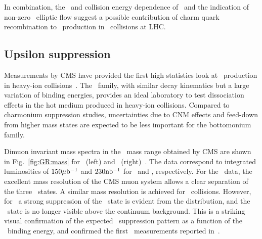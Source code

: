 In combination, the \pT\ and collision energy dependence of \jpsi \Raa\ and the indication of non-zero \jpsi\ elliptic
flow suggest a possible  contribution of charm quark recombination to \jpsi\ production in \PbPb\ collisions
at LHC.

\subsection{Upsilon suppression}

Measurements by CMS have provided the first high statistics look at \PgU\
production in heavy-ion collisions~\cite{CMS_Y_2010}.
The \PgU\ family, with similar decay kinematics but a large variation of binding energies,
provides an ideal laboratory to test dissociation effects in the hot medium produced in
heavy-ion collisions. Compared to charmonium suppression studies, uncertainties due
to CNM effects and feed-down from higher mass states are expected to be
less important for the bottomonium family.

Dimuon invariant mass spectra in the \PgU\ mass range obtained by CMS are shown in Fig.~\ref{fig:GR:mass} for \PbPb\ (left)
and \pp\ (right)~\cite{Chatrchyan:2012lxa}. The data correspond to integrated luminosities of $150\mathrm{\mu b^{-1}}$ and $230 \mathrm{nb^{-1}}$ for
\PbPb\ and \pp, respectively. For the \pp\ data, the excellent mass resolution of the CMS muon system
allows a clear separation of the three \PgUn\ states. A similar mass resolution is achieved for \PbPb\ collisions.
However, for \PbPb\ a strong suppression of the \PgUb\ state is evident from the distribution, and the \PgUc\ state
is no longer visible above the continuum background. This is a striking visual confirmation of the expected
\PgU\ suppression pattern as a function of the \PgUn\ binding energy, and confirmed the first \PgU\ measurements
reported in~\cite{CMS_Y_2010}.

